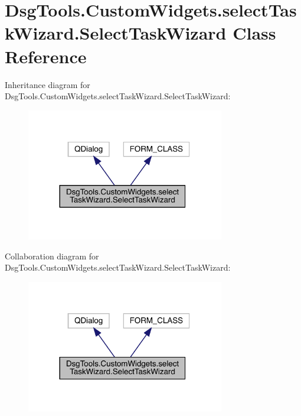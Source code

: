 \hypertarget{class_dsg_tools_1_1_custom_widgets_1_1select_task_wizard_1_1_select_task_wizard}{}\section{Dsg\+Tools.\+Custom\+Widgets.\+select\+Task\+Wizard.\+Select\+Task\+Wizard Class Reference}
\label{class_dsg_tools_1_1_custom_widgets_1_1select_task_wizard_1_1_select_task_wizard}


Inheritance diagram for Dsg\+Tools.\+Custom\+Widgets.\+select\+Task\+Wizard.\+Select\+Task\+Wizard\+:
\nopagebreak
\begin{figure}[H]
\begin{center}
\leavevmode
\includegraphics[width=245pt]{class_dsg_tools_1_1_custom_widgets_1_1select_task_wizard_1_1_select_task_wizard__inherit__graph}
\end{center}
\end{figure}


Collaboration diagram for Dsg\+Tools.\+Custom\+Widgets.\+select\+Task\+Wizard.\+Select\+Task\+Wizard\+:
\nopagebreak
\begin{figure}[H]
\begin{center}
\leavevmode
\includegraphics[width=245pt]{class_dsg_tools_1_1_custom_widgets_1_1select_task_wizard_1_1_select_task_wizard__coll__graph}
\end{center}
\end{figure}
